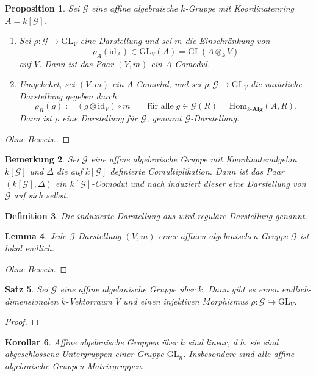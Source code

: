\documentclass[a4paper, 11pt]{scrartcl}
\newcommand{\Hom}{\text{Hom}}
\newcommand{\id}{\text{id}}
\theoremstyle{basicstyle}
\newtheorem{definition}{Definition}[section]
\newtheorem{bemerkung}[definition]{Bemerkung}
\newtheorem{lemma}[definition]{Lemma}
\newtheorem{korollar}[definition]{Korollar}
\newtheorem{satz}[definition]{Satz}
\newtheorem{proposition}[definition]{Proposition}
\begin{document}
    \begin{proposition}\label{prop:2}
        Sei \(\mathcal{G}\) eine affine algebraische \(k\)-Gruppe mit Koordinatenring \(A = k[\mathcal{G}]\).
        \begin{enumerate}
            \item Sei \(\rho : \mathcal{G} \to \text{GL}_V\) eine Darstellung und sei \(m\) die Einschränkung von
                \[\rho_A(\id_A) \in \text{GL}_V(A) = \text{GL}(A \otimes_k V)\]
                auf \(V\).
                Dann ist das Paar \((V, m)\) ein \(A\)-Comodul.

            \item Umgekehrt, sei \((V, m)\) ein \(A\)-Comodul, und sei \(\rho: \mathcal{G} \to \text{GL}_V\) die \emph{natürliche Darstellung} gegeben durch
                \[\rho_R(g) := (g \otimes \id_V) \circ m \qquad \text{für alle}\; g \in \mathcal{G}(R) = \Hom_{k\textbf{-Alg}}(A, R).\]
                Dann ist \(\rho\) eine Darstellung für \(\mathcal{G}\), genannt \(\mathcal{G}\)-Darstellung.
        \end{enumerate}
    \end{proposition}
    \begin{proof}[Ohne Beweis.]
    \end{proof}
    
    \begin{bemerkung}\label{bem:3}
        Sei \(\mathcal{G}\) eine affine algebraische Gruppe mit Koordinatenalgebra \(k[\mathcal{G}]\) und \(\Delta\) die auf \(k[\mathcal{G}]\) definierte Comultiplikation.
        Dann ist das Paar \((k[\mathcal{G}], \Delta)\) ein \(k[\mathcal{G}]\)-Comodul und nach  induziert dieser eine Darstellung von \(\mathcal{G}\) auf sich selbst.
    \end{bemerkung}

    \begin{definition}
        Die induzierte Darstellung aus  wird \emph{reguläre Darstellung} genannt.
    \end{definition}

    \begin{lemma}
        Jede \(\mathcal{G}\)-Darstellung \((V, m)\) einer affinen algebraischen Gruppe \(\mathcal{G}\) ist lokal endlich.
    \end{lemma}
    \begin{proof}[Ohne Beweis]
    \end{proof}

    \begin{satz}
        Sei \(\mathcal{G}\) eine affine algebraische Gruppe über \(k\).
        Dann gibt es einen endlich-dimensionalen \(k\)-Vektorraum \(V\) und einen injektiven Morphismus \(\rho: \mathcal{G} \hookrightarrow \text{GL}_V\).
    \end{satz}
    \begin{proof}
        
    \end{proof}

    \begin{korollar}
        Affine algebraische Gruppen über \(k\) sind linear, d.h. sie sind abgeschlossene Untergruppen einer Gruppe \(\text{GL}_n\).
        Insbesondere sind alle affine algebraische Gruppen Matrixgruppen.
    \end{korollar}
\end{document}
